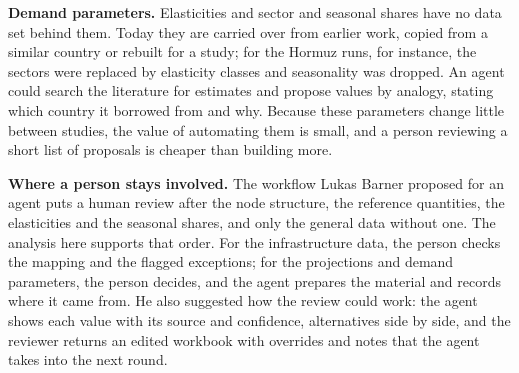 \textbf{Demand parameters.} Elasticities and sector and seasonal shares have no data set behind them.
Today they are carried over from earlier work, copied from a similar country or rebuilt for a study; for the Hormuz runs, for instance, the sectors were replaced by elasticity classes and seasonality was dropped.
An agent could search the literature for estimates and propose values by analogy, stating which country it borrowed from and why.
Because these parameters change little between studies, the value of automating them is small, and a person reviewing a short list of proposals is cheaper than building more.

\textbf{Where a person stays involved.} The workflow Lukas Barner proposed for an agent puts a human review after the node structure, the reference quantities, the elasticities and the seasonal shares, and only the general data without one.
The analysis here supports that order.
For the infrastructure data, the person checks the mapping and the flagged exceptions; for the projections and demand parameters, the person decides, and the agent prepares the material and records where it came from.
He also suggested how the review could work: the agent shows each value with its source and confidence, alternatives side by side, and the reviewer returns an edited workbook with overrides and notes that the agent takes into the next round.
